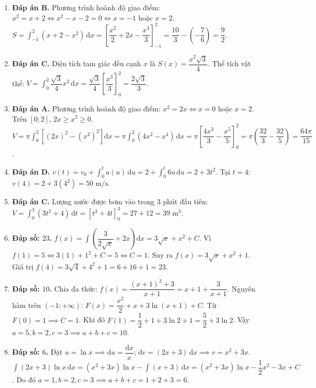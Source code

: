 \documentclass[12pt,a4paper]{article}
\begin{document}
\begin{enumerate}[start=16]
\item \textbf{Đáp án B.}  
Phương trình hoành độ giao điểm: $x^2 = x + 2 \iff x^2 - x - 2 = 0 \iff x = -1$ hoặc $x = 2$.  
$S = \int_{-1}^2 (x + 2 - x^2)\,\mathrm{d}x = \left[\dfrac{x^2}{2} + 2x - \dfrac{x^3}{3}\right]_{-1}^2 = \dfrac{10}{3} - \left(-\dfrac{7}{6}\right) = \dfrac{9}{2}$.

\item \textbf{Đáp án C.}  
Diện tích tam giác đều cạnh $x$ là $S(x) = \dfrac{x^2\sqrt{3}}{4}$.  
Thể tích vật thể: $V = \int_0^2 \dfrac{\sqrt{3}}{4}x^2\,\mathrm{d}x = \dfrac{\sqrt{3}}{4}\left[\dfrac{x^3}{3}\right]_0^2 = \dfrac{2\sqrt{3}}{3}$.

\item \textbf{Đáp án A.}  
Phương trình hoành độ giao điểm: $x^2 = 2x \iff x = 0$ hoặc $x = 2$.  
Trên $[0; 2]$, $2x \ge x^2 \ge 0$.  
$V = \pi \int_0^2 \left[(2x)^2 - (x^2)^2\right]\mathrm{d}x = \pi \int_0^2 (4x^2 - x^4)\,\mathrm{d}x = \pi\left[\dfrac{4x^3}{3} - \dfrac{x^5}{5}\right]_0^2 = \pi\left(\dfrac{32}{3} - \dfrac{32}{5}\right) = \dfrac{64\pi}{15}$.

\item \textbf{Đáp án D.}  
$v(t) = v_0 + \int_0^t a(u)\,\mathrm{d}u = 2 + \int_0^t 6u\,\mathrm{d}u = 2 + 3t^2$.  
Tại $t = 4$: $v(4) = 2 + 3(4^2) = 50\text{ m/s}$.

\item \textbf{Đáp án C.}  
Lượng nước được bơm vào trong $3$ phút đầu tiên:  
$V = \int_0^3 (3t^2 + 4)\,\mathrm{d}t = [t^3 + 4t]_0^3 = 27 + 12 = 39\text{ m}^3$.

\item \textbf{Đáp số: $23$.}  
$f(x) = \int \left(\dfrac{3}{2\sqrt{x}} + 2x\right)\mathrm{d}x = 3\sqrt{x} + x^2 + C$.  
Vì $f(1) = 5 \iff 3(1) + 1^2 + C = 5 \iff C = 1$.  
Suy ra $f(x) = 3\sqrt{x} + x^2 + 1$.  
Giá trị $f(4) = 3\sqrt{4} + 4^2 + 1 = 6 + 16 + 1 = 23$.

\item \textbf{Đáp số: $10$.}  
Chia đa thức: $f(x) = \dfrac{(x+1)^2 + 3}{x+1} = x + 1 + \dfrac{3}{x+1}$.  
Nguyên hàm trên $(-1; +\infty)$: $F(x) = \dfrac{x^2}{2} + x + 3\ln(x+1) + C$.  
Từ $F(0) = 1 \implies C = 1$.  
Khi đó $F(1) = \dfrac{1}{2} + 1 + 3\ln 2 + 1 = \dfrac{5}{2} + 3\ln 2$.  
Vậy $a = 5, b = 2, c = 3 \implies a + b + c = 10$.

\item \textbf{Đáp số: $6$.}  
Đặt $u = \ln x \implies \mathrm{d}u = \dfrac{\mathrm{d}x}{x}$; $\mathrm{d}v = (2x + 3)\,\mathrm{d}x \implies v = x^2 + 3x$.  
$\int (2x + 3)\ln x\,\mathrm{d}x = (x^2 + 3x)\ln x - \int (x + 3)\,\mathrm{d}x = (x^2 + 3x)\ln x - \dfrac{1}{2}x^2 - 3x + C$.  
Do đó $a = 1, b = 2, c = 3 \implies a + b + c = 1 + 2 + 3 = 6$.


\end{enumerate}
\end{document}
